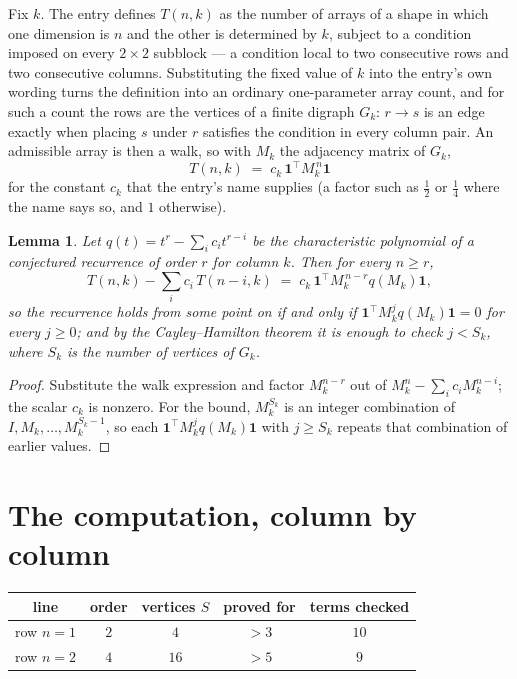 \documentclass[11pt,a4paper]{article}
\theoremstyle{plain}
\newtheorem{lemma}[theorem]{Lemma}
\theoremstyle{definition}
\begin{document}
Fix $k$. The entry defines $T(n,k)$ as the number of arrays of a shape in which one dimension
is $n$ and the other is determined by $k$, subject to a condition imposed on every
$2\times2$ subblock --- a condition local to two consecutive rows and two consecutive columns.
Substituting the fixed value of $k$ into the entry's own wording turns the definition into an
ordinary one-parameter array count, and for such a count the rows are the vertices of a finite
digraph $G_k$: $r\to s$ is an edge exactly when placing $s$ under $r$ satisfies the condition
in every column pair. An admissible array is then a walk, so with $M_k$ the adjacency matrix
of $G_k$,
\[
T(n,k)\;=\;c_k\,\mathbf{1}^{\!\top}M_k^{\,n}\mathbf{1}
\]
for the constant $c_k$ that the entry's name supplies (a factor such as $\tfrac12$ or
$\tfrac14$ where the name says so, and $1$ otherwise).

\begin{lemma}\label{lem:crit}
Let $q(t)=t^{r}-\sum_i c_it^{r-i}$ be the characteristic polynomial of a conjectured
recurrence of order $r$ for column $k$. Then for every $n\ge r$,
\[
T(n,k)-\sum_i c_i\,T(n-i,k)\;=\;c_k\,\mathbf{1}^{\!\top}M_k^{\,n-r}q(M_k)\mathbf{1},
\]
so the recurrence holds from some point on if and only if
$\mathbf{1}^{\!\top}M_k^{j}q(M_k)\mathbf{1}=0$ for every $j\ge0$; and by the
Cayley--Hamilton theorem it is enough to check $j<S_k$, where $S_k$ is the number of vertices
of $G_k$.
\end{lemma}

\begin{proof}
Substitute the walk expression and factor $M_k^{n-r}$ out of $M_k^{n}-\sum_ic_iM_k^{n-i}$;
the scalar $c_k$ is nonzero. For the bound, $M_k^{S_k}$ is an integer combination of
$I,M_k,\dots,M_k^{S_k-1}$, so each $\mathbf{1}^{\!\top}M_k^{j}q(M_k)\mathbf{1}$ with
$j\ge S_k$ repeats that combination of earlier values.
\end{proof}

\section{The computation, column by column}

\begin{center}
\begin{tabular}{ccccc}
line & order & vertices $S$ & proved for & terms checked \\ \hline
row $n$$=1$ & $2$ & $4$ & $>3$ & $10$ \\
row $n$$=2$ & $4$ & $16$ & $>5$ & $9$ \\
\end{tabular}
\end{center}
\end{document}
